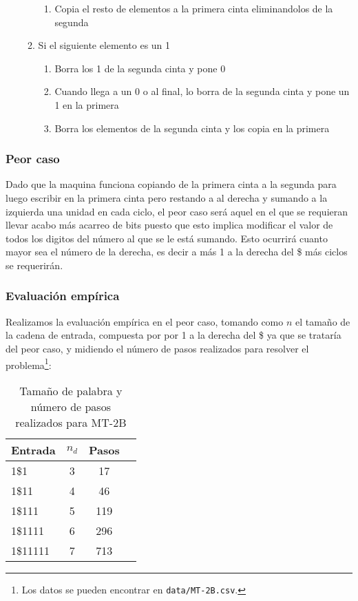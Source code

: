 \begin{itemize}
\begin{enumerate}
\begin{enumerate}
            \item Copia el resto de elementos a la primera cinta eliminandolos de la segunda
        \end{enumerate}
        \item Si el siguiente elemento es un 1
        \begin{enumerate}
            \item Borra los 1 de la segunda cinta y pone 0
            \item Cuando llega a un 0 o al final, lo borra de la segunda cinta y pone un 1 en la primera
            \item Borra los elementos de la segunda cinta y los copia en la primera
        \end{enumerate}
    \end{enumerate}
\end{itemize}



\subsubsection*{Peor caso}
Dado que la maquina funciona copiando de la primera cinta a la segunda para luego escribir en la primera cinta pero restando a al derecha y sumando a la izquierda una unidad en cada ciclo, el peor caso será aquel en el que se requieran llevar acabo más acarreo de bits puesto que esto implica modificar el valor de todos los digitos del número al que se le está sumando. Esto ocurrirá cuanto mayor sea el número de la derecha, es decir a más 1 a la derecha del \$ más ciclos se requerirán.\medskip

\subsubsection*{Evaluación empírica}
Realizamos la evaluación empírica en el peor caso, tomando como $n$ el tamaño de la cadena de entrada, compuesta por por 1 a la derecha del \$ ya que se trataría del peor caso, y midiendo el número de pasos realizados para resolver el problema\footnote{Los datos se pueden encontrar en \texttt{data/MT-2B.csv}.}:

\begin{table}[h]
    \centering
    \begin{tabular}{lccc}
        Entrada & $n_d$ & Pasos \\
        \hline
        1\$1                     & 3  & 17   \\
        1\$11                    & 4  & 46   \\
        1\$111                   & 5  & 119   \\
        1\$1111                  & 6  & 296  \\
        1\$11111                 & 7  & 713  \\
    \end{tabular}
    \caption{Tamaño de palabra y número de pasos realizados para MT-2B}
\end{table}

